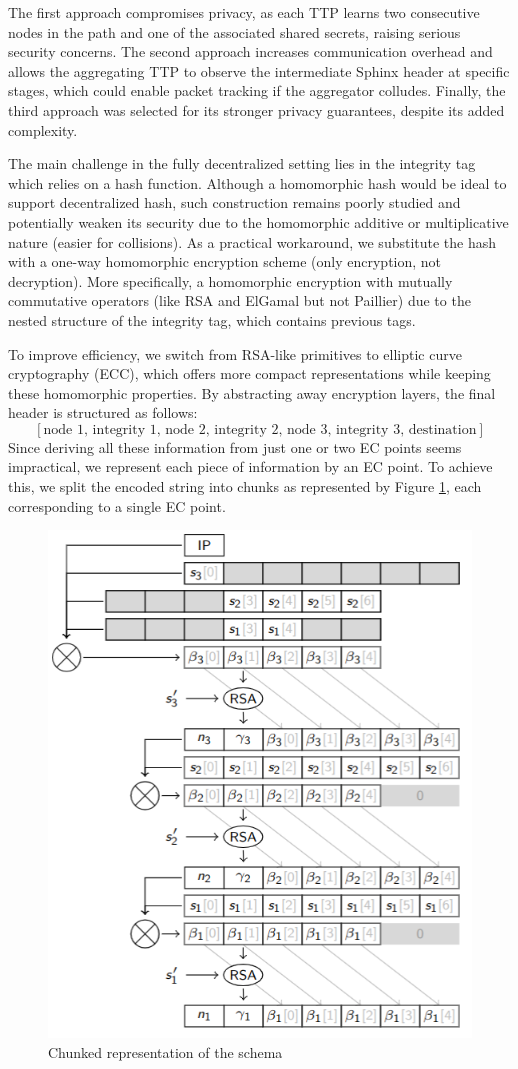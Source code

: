 The first approach compromises privacy, as each TTP learns two consecutive nodes in the path and one of the associated shared secrets, raising serious security concerns.
The second approach increases communication overhead and allows the aggregating TTP to observe the intermediate Sphinx header at specific stages, which could enable packet tracking if the aggregator colludes.
Finally, the third approach was selected for its stronger privacy guarantees, despite its added complexity.
\newline

The main challenge in the fully decentralized setting lies in the integrity tag which relies on a hash function. 
Although a homomorphic hash would be ideal to support decentralized hash, such construction remains poorly studied and potentially weaken its security due to the homomorphic additive or multiplicative nature (easier for collisions).
As a practical workaround, we substitute the hash with a one-way homomorphic encryption scheme (only encryption, not decryption). 
More specifically, a homomorphic encryption with mutually commutative operators (like RSA and ElGamal but not Paillier) due to the nested structure of the integrity tag, which contains previous tags.

To improve efficiency, we switch from RSA-like primitives to elliptic curve cryptography (ECC), which offers more compact representations while keeping these homomorphic properties.
By abstracting away encryption layers, the final header is structured as follows: 
\[
[\text{node 1, integrity 1, node 2, integrity 2, node 3, integrity 3, destination}]
\]
Since deriving all these information from just one or two EC points seems impractical, we represent each piece of information by an EC point.
To achieve this, we split the encoded string into chunks as represented by Figure \ref{fig:chunked_schema}, each corresponding to a single EC point.

\begin{figure}[H]
    \centering
    \includegraphics[width=0.6\linewidth]{Images/chunked_structure.png}
    \caption{Chunked representation of the schema}
    \label{fig:chunked_schema}
\end{figure}

